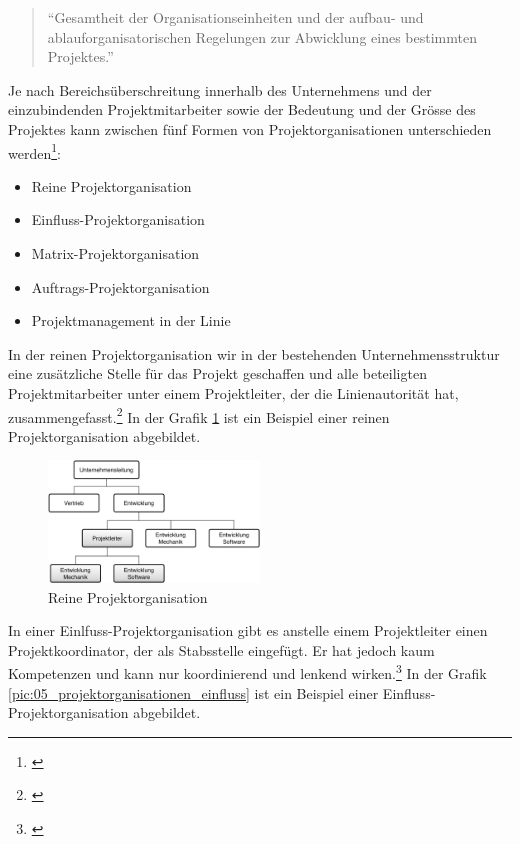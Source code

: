 \begin{quote}
``Gesamtheit der Organisationseinheiten und der aufbau- und ablauforganisatorischen
Regelungen zur Abwicklung eines bestimmten Projektes.''
\end{quote}

Je nach Bereichsüberschreitung innerhalb des Unternehmens und der einzubindenden
Projektmitarbeiter sowie der Bedeutung und der Grösse des Projektes kann zwischen
fünf Formen von Projektorganisationen unterschieden werden\footnote{\citealp*[Vgl.][S. 56]{burghardt2007einfuehrung}}:

\begin{itemize}
    \item Reine Projektorganisation
    \item Einfluss-Projektorganisation
    \item Matrix-Projektorganisation
    \item Auftrags-Projektorganisation
    \item Projektmanagement in der Linie
\end{itemize}

In der reinen Projektorganisation wir in der bestehenden Unternehmensstruktur
eine zusätzliche Stelle für das Projekt geschaffen und alle beteiligten 
Projektmitarbeiter unter einem Projektleiter, der die Linienautorität hat, 
zusammengefasst.\footnote{\citealp*[Vgl.][S. 56]{burghardt2007einfuehrung}}
In der Grafik \ref{pic:05_projektorganisationen_reine} ist 
ein Beispiel einer reinen Projektorganisation abgebildet.

\begin{figure}[htbp]
\begin{center}
\includegraphics[width=0.5\textwidth,angle=0]{./bilder/theorie/05_projektorganisationen_reine.pdf}
\caption{Reine Projektorganisation}
\label{pic:05_projektorganisationen_reine}
\end{center}
\end{figure}

In einer Einlfuss-Projektorganisation gibt es anstelle einem Projektleiter
einen Projektkoordinator, der als Stabsstelle eingefügt. Er hat jedoch kaum
Kompetenzen und kann nur koordinierend und lenkend wirken.\footnote{\citealp*[Vgl.][S. 57]{burghardt2007einfuehrung}}
In der Grafik \ref{pic:05_projektorganisationen_einfluss}
ist ein Beispiel einer Einfluss-Projektorganisation abgebildet.

